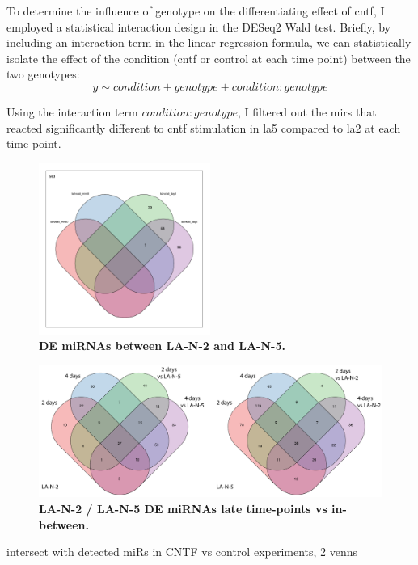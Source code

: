 To determine the influence of genotype on the differentiating effect of \ac{cntf}, I employed a statistical interaction design in the DESeq2 Wald test. Briefly, by including an interaction term in the linear regression formula, we can statistically isolate the effect of the condition (\ac{cntf} or control at each time point) between the two genotypes: $$y \sim condition + genotype + condition:genotype$$

Using the interaction term $condition:genotype$, I filtered out the \acp{mir} that reacted significantly different to \ac{cntf} stimulation in \ac{la5} compared to \ac{la2} at each time point. 

\begin{figure} 
\centering
\includegraphics[width=0.5\textwidth]{figures/la2-vs-la5-venn}
\caption[DE miRNAs between LA-N-2 and LA-N-5.]{\textbf{DE miRNAs between LA-N-2 and LA-N-5.}
\label{fig:la2-vs-la5-venn}}
\end{figure}
\begin{figure}
\centering
\includegraphics[width=\textwidth]{figures/la2-vs-la5-overlap-venn}
\caption[LA-N-2 / LA-N-5 DE miRNAs late time points vs in-between.]{\textbf{LA-N-2 / LA-N-5 DE miRNAs late time-points vs in-between.}
\label{fig:la2-vs-la5-overlap-venn}}
\end{figure}

intersect with detected miRs in CNTF vs control experiments, 2 venns


